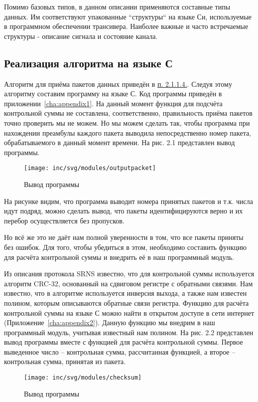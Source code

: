 Помимо базовых типов, в данном описании применяются составные типы данных. Им
соответствуют упакованные “структуры“ на языке Си, используемые в программном обеспе­чении трансивера. Наиболее важные и часто встречаемые структуры - описание сигнала и
состояние канала\cite{srns}.

\subsection{Реализация алгоритма на языке С}

Алгоритм для приёма пакетов данных приведён в \hyperlink{algorythm}{п. 2.1.1.4.}. Следуя этому алгоритму составим программу на языке С. Код программы приведён в приложении~\ref{cha:appendix1}.
На данный момент функция для подсчёта контрольной суммы не составлена, соответственно, правильность приёма пакетов точно проверить мы не можем. Но мы можем сделать так, чтобы программа при нахождении преамбулы каждого пакета выводила непосредственно номер пакета, обрабатываемого в данный момент времени. На рис. 2.1 представлен вывод программы.
\begin{figure}[ht]
	\centering
	\texttt{[image: inc/svg/modules/outputpacket]}
	\caption{Вывод программы}
	\label{fig:outputpacket}
\end{figure}

На рисунке видим, что программа выводит номера принятых пакетов и т.к. числа идут подряд, можно сделать вывод, что пакеты идентифицируются верно и их перебор осуществляется без пропусков.

Но всё же это не даёт нам полной уверенности в том, что все пакеты приняты без ошибок. Для того, чтобы убедиться в этом, необходимо составить функцию для расчёта контрольной суммы и внедрить её в наш программный модуль.

Из описания протокола SRNS известно, что для контрольной суммы используется алгоритм CRC-32, основанный на сдвиговом регистре с обратными связями. Нам известно, что в алгоритме используется инверсия выхода, а также нам известен полином, которым описываются обратные связи регистра. Функцию для расчёта контрольной суммы на языке С можно найти в открытом доступе в сети интернет (Приложение~\ref{cha:appendix2}). Данную функцию мы внедрим в наш программный модуль, учитывая известный нам полином. На рис. 2.2 представлен вывод программы вместе с функцией для расчёта контрольной суммы. Первое выведенное число -- контрольная сумма, рассчитанная функцией, а второе -- контрольная сумма, принятая из пакета.
\begin{figure}[ht]
	\centering
	\texttt{[image: inc/svg/modules/checksum]}
	\caption{Вывод программы}
	\label{fig:checksum}
\end{figure}

